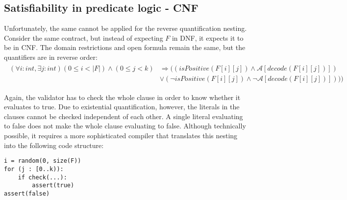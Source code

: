\subsection{Satisfiability in predicate logic - CNF}
Unfortunately, the same cannot be applied for the reverse quantification nesting. Consider the same contract, but instead of expecting $F$ in DNF, it expects it to be in CNF. The domain restrictions and open formula remain the same, but the quantifiers are in reverse order:
\begin{gather*}\label{eq:cnf_sat}
\begin{aligned}
(\forall i : int, \exists j : int) (0 \leq i < |F|) \wedge (0 \leq j < k) &\Rightarrow ((isPositive(F[i][j]) \wedge \mathcal{A}[decode(F[i][j])]) \\
&\vee (\neg isPositive(F[i][j]) \wedge \neg \mathcal{A}[decode(F[i][j])])))
\end{aligned}
\end{gather*}

Again, the validator has to check the whole clause in order to know whether it evaluates to true. Due to existential quantification, however, the literals in the clauses cannot be checked independent of each other. A single literal evaluating to false does not make the whole clause evaluating to false. Although technically possible, it requires a more sophisticated compiler that translates this nesting into the following code structure:
\begin{lstlisting}[label=lst:rand_loop_dependent]
i = random(0, size(F))
for (j : [0..k)):
	if check(...):
		assert(true)
assert(false)
\end{lstlisting}

